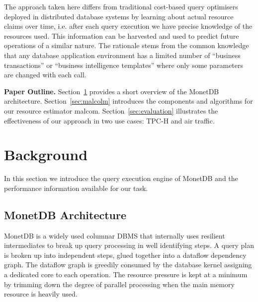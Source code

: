 \documentclass[conference]{IEEEtran}
\def\Skip{\par\medskip\nobreak\noindent}
\begin{document}
The approach taken here differs from traditional cost-based query optimisers deployed in distributed database systems by learning about actual resource claims over time, i.e. after each query execution we have precise knowledge of the resources used.
This information can be harvested and used to predict future operations of a similar nature.
The rationale stems from the common knowledge that any database application environment has a limited number of ``business transactions'' or ``business intelligence templates'' where only some parameters are changed with each call.

\Skip
\textbf{Paper Outline.}
Section~\ref{sec:background} provides a short overview of the MonetDB architecture. %
Section~\ref{sec:malcolm} introduces the components and algorithms for our resource estimator {\sc malcom}.
Section~\ref{sec:evaluation} illustrates the effectiveness of our approach in two use cases: TPC-H and air traffic.

\section{Background}
\label{sec:background} 
In this section we introduce the query execution engine of MonetDB and the performance information available for our task.

\subsection{MonetDB Architecture}
MonetDB is a widely used columnar DBMS that internally uses resilient intermediates to break up query processing in well identifying steps. 
A query plan is broken up into independent steps, glued together into a dataflow dependency graph.
The dataflow graph is greedily consumed by the database kernel assigning a dedicated core to each operation.
The resource pressure is kept at a minimum by trimming down the degree of parallel processing when the main memory resource is heavily used.
\end{document}
